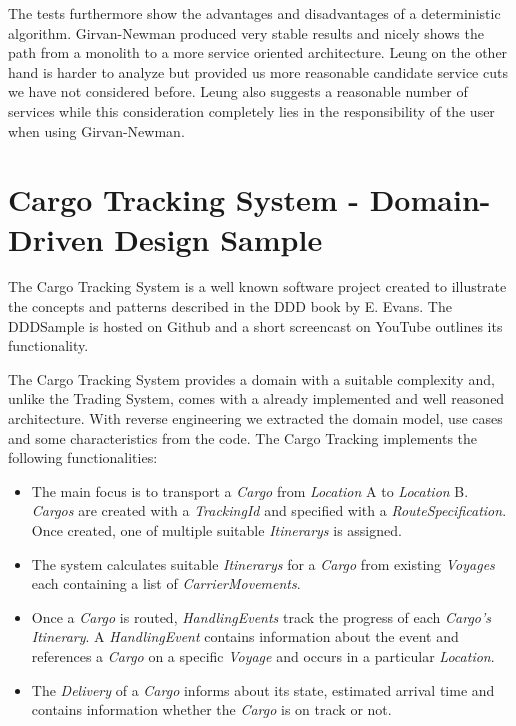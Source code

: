 The tests furthermore show the advantages and disadvantages of a deterministic algorithm. Girvan-Newman produced very stable results and nicely shows the path from a monolith to a more service oriented architecture. Leung on the other hand is harder to analyze but provided us more reasonable candidate service cuts we have not considered before. Leung also suggests a reasonable number of services while this consideration completely lies in the responsibility of the user when using Girvan-Newman.

\section{Cargo Tracking System - Domain-Driven Design Sample}
\label{sec:dddSample}

The Cargo Tracking System is a well known software project created to illustrate the concepts and patterns described in the \gls{DDD} book by E. Evans\cite{evans2003domain}. The DDDSample is hosted on Github\cite{dddGithub} and a short screencast on YouTube\cite{dddScreencast} outlines its functionality. 

The Cargo Tracking System provides a domain with a suitable complexity and, unlike the Trading System, comes with a already implemented and well reasoned architecture. With reverse engineering we extracted the domain model, use cases and some characteristics from the code. The Cargo Tracking implements the following functionalities:

\begin{itemize}
	\item The main focus is to transport a \textit{Cargo} from \textit{Location} A to \textit{Location} B. \textit{Cargos} are created with a \textit{TrackingId} and specified with a \textit{RouteSpecification}. Once created, one of multiple suitable \textit{Itinerarys} is assigned.
	\item The system calculates suitable \textit{Itinerarys} for a \textit{Cargo} from existing \textit{Voyages} each containing a list of \textit{CarrierMovements}.
	\item Once a \textit{Cargo} is routed, \textit{HandlingEvents} track the progress of each \textit{Cargo's} \textit{Itinerary}. A \textit{HandlingEvent} contains information about the event and references a \textit{Cargo} on a specific \textit{Voyage} and occurs in a particular \textit{Location}. 
	\item The \textit{Delivery} of a \textit{Cargo} informs about its state, estimated arrival time and contains information whether the \textit{Cargo} is on track or not.
\end{itemize}

